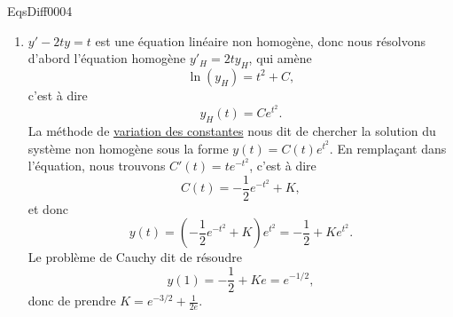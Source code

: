
\begin{corrige}{EqsDiff0004}

\begin{enumerate}

\item
$y'-2ty=t$ est une équation linéaire non homogène, donc nous résolvons d'abord l'équation homogène $y'_H=2ty_H$, qui amène
\begin{equation}
	\ln(y_H)=t^2+C,
\end{equation}
c'est à dire
\begin{equation}
	y_H(t)=C e^{t^2}.
\end{equation}
La méthode de \href{http://fr.wikipedia.org/wiki/Méthode_de_variation_des_constantes}{variation des constantes} nous dit de chercher la solution du système non homogène sous la forme $y(t)=C(t) e^{t^2}$. En remplaçant dans l'équation, nous trouvons $C'(t)=t e^{-t^2}$, c'est à dire
\begin{equation}
	C(t)=-\frac{ 1 }{2} e^{-t^2}+K,
\end{equation}
et donc
\begin{equation}
	y(t)=(-\frac{1}{ 2 } e^{-t^2}+K) e^{t^2}=-\frac{1}{ 2 }+K e^{t^2}.
\end{equation}
Le problème de Cauchy dit de résoudre
\begin{equation}
	y(1)=-\frac{ 1 }{2}+Ke= e^{-1/2},
\end{equation}
donc de prendre $K= e^{-3/2}+\frac{1}{ 2e }$.



\end{enumerate}
\end{corrige}
